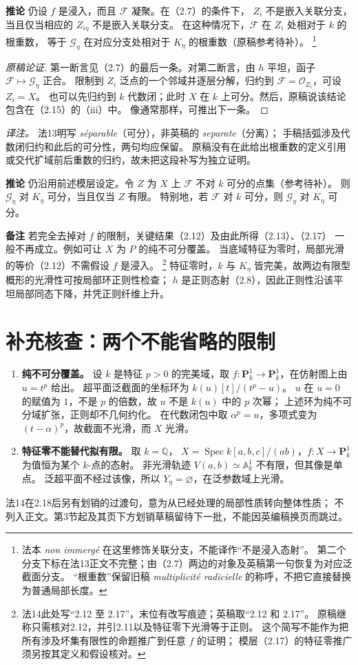 \documentclass[openany,fontset=fandol]{ctexbook}
\newcommand{\OO}{\mathcal O}
\newcommand{\FF}{\mathcal F}
\newcommand{\GG}{\mathcal G}
\newcommand{\PP}{\mathbf P}
\DeclareMathOperator{\Spec}{Spec}
\newcommand{\tagitem}[2]{\par\medskip\noindent\textbf{#1\quad #2}\enspace}
\begin{document}
\tagitem{推论}{2.16}
仍设 $f$ 是浸入，而且 $\FF$ 凝聚。在（2.7）的条件下，
$Z_i$ 不是嵌入关联分支，当且仅当相应的 $Z_{i\eta}$ 不是嵌入关联分支。
在这种情况下，$\FF$ 在 $Z_i$ 处相对于 $k$ 的根重数，
等于 $\GG_\eta$ 在对应分支处相对于 $K_\eta$ 的根重数（原稿参考待补）。
\footnote{法本 \emph{non immergé} 在这里修饰关联分支，不能译作“不是浸入态射”。
第二个分支下标在法13正文不完整；由（2.7）两边的对象及英稿第一句恢复为对应泛截面分支。
“根重数”保留旧稿 \emph{multiplicité radicielle} 的称呼，不把它直接替换为普通局部长度。}
\begin{proof}[原稿论证]
第一断言见（2.7）的最后一条。对第二断言，由 $h$ 平坦，函子 $\FF\mapsto\GG_\eta$ 正合。
限制到 $Z_i$ 泛点的一个邻域并逐层分解，归约到 $\FF=\OO_{Z_i}$，可设 $Z_i=X$。
也可以先归约到 $k$ 代数闭；此时 $X$ 在 $k$ 上可分。然后，原稿说该结论包含在（2.15）的（iii）中。
像通常那样，可推出下一条。
\end{proof}
\noindent\emph{译注。} 法13明写 \emph{séparable}（可分），非英稿的 \emph{separate}（分离）；
手稿括弧涉及代数闭归约和此后的可分性，两句均应保留。
原稿没有在此给出根重数的定义引用或交代扩域前后重数的归约，故未把这段补写为独立证明。

\tagitem{推论}{2.17}
仍沿用前述模层设定。令 $Z$ 为 $X$ 上 $\FF$ 不对 $k$ 可分的点集（参考待补）。
则 $\GG_\eta$ 对 $K_\eta$ 可分，当且仅当 $Z$ 有限。
特别地，若 $\FF$ 对 $k$ 可分，则 $\GG_\eta$ 对 $K_\eta$ 可分。

\tagitem{备注}{2.18}
若完全去掉对 $f$ 的限制，关键结果（2.12）及由此所得（2.13）、（2.17）
一般不再成立。例如可让 $X$ 为 $P$ 的纯不可分覆盖。
当底域特征为零时，局部光滑的等价（2.12）不需假设 $f$ 是浸入。
\footnote{法14此处写“2.12 至 2.17”，末位有改写痕迹；英稿取“2.12 和 2.17”。
原稿继称只需核对2.12，并引2.11以及特征零下光滑等于正则。
这个简写不能作为把所有涉及坏集有限性的命题推广到任意 $f$ 的证明；
模层（2.17）的特征零推广须另按其定义和假设核对。}
特征零时，$k$ 与 $K_\eta$ 皆完美，故两边有限型概形的光滑性可按局部环正则性检查；
$h$ 是正则态射（2.8），因此正则性沿该平坦局部同态下降，并凭正则纤维上升。

\section*{补充核查：两个不能省略的限制}
\begin{enumerate}
 \item \textbf{纯不可分覆盖。} 设 $k$ 是特征 $p>0$ 的完美域，取
 $f:\PP^1_k\to\PP^1_k$，在仿射图上由 $u=t^p$ 给出。
 超平面泛截面的坐标环为 $k(u)[t]/(t^p-u)$。
 $u$ 在 $u=0$ 的赋值为 $1$，不是 $p$ 的倍数，故 $u$ 不是 $k(u)$ 中的 $p$ 次幂；
 上述环为纯不可分域扩张，正则却不几何约化。
 在代数闭包中取 $\alpha^p=u$，多项式变为 $(t-\alpha)^p$，故截面不光滑，而 $X$ 光滑。
 \item \textbf{特征零不能替代拟有限。} 取 $k=\mathbb Q$，
 $X=\Spec k[a,b,c]/(ab)$，$f:X\to\PP^1_k$ 为值恒为某个 $k$-点的态射。
 非光滑轨迹 $V(a,b)\simeq\mathbb A^1_k$ 不有限，但其像是单点。
 泛超平面不经过该像，所以 $Y_\eta=\varnothing$，在泛参数域上光滑。
\end{enumerate}
\noindent 法14在2.18后另有划销的过渡句，意为从已经处理的局部性质转向整体性质；
不列入正文。第3节起及其页下方划销草稿留待下一批，不能因英编稿换页而跳过。
\end{document}
